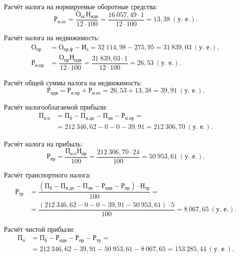 Расчёт налога на нормируемые оборотные средства:
\begin{equation*}
  \text{Р}_{\text{н.ос}} =
  \dfrac{\text{О}_{\text{ос}} \text{Н}_{\text{ндв}}}{12 \cdot 100} =
  \dfrac{16~057{,}49 \cdot 1}{12 \cdot 100} = 13{,}38 ~ (\text{у.~е.}).
\end{equation*}

Расчёт налога на недвижимость:
\begin{align*}
  \text{О}_{\text{пр}} &= \text{О}_{\text{пр.ф}} - \text{И}_{\text{з}} =
  32~114{,}98 - 275{,}95 = 31~839{,}03 ~ (\text{у.~е.}), \\
  \text{Р}_{\text{н.пр}} &=
  \dfrac{\text{О}_{\text{пр}} \text{Н}_{\text{ндв}}}{12 \cdot 100} =
  \dfrac{31~839{,}03 \cdot 1}{12 \cdot 100} =
  26{,}53~(\text{у.~е.}).
\end{align*}

Расчёт общей суммы налога на недвижимость:
\begin{equation*}
  \text{Р}_{\text{ндв}} = \text{Р}_{\text{н.пр}} + \text{Р}_{\text{н.ос}} =
  26{,}53 + 13{,}38 = 39{,}91~(\text{у.~е.}).
\end{equation*}

Расчёт налогооблагаемой прибыли:
\begin{align*}
  \text{П}_{\text{н.о}} &= \text{П}_{\text{б}} -
  \text{П}_{\text{н.до}} - \text{П}_{\text{лн}} - \text{Р}_{\text{н.пр}} = \\
  &= 212~346{,}62 - 0 - 0 - 39{,}91 = 212~306{,}70~(\text{у.~е.}).
\end{align*}

Расчёт налога на прибыль:
\begin{equation*}
  \text{Р}_{\text{пр}} =
  \dfrac{\text{П}_{\text{н.о}} \text{Н}_{\text{пр}}}{100} =
  \dfrac{212~306{,}70 \cdot 24}{100} =
  50~953{,}61~(\text{у.~е.}).
\end{equation*}

Расчёт транспортного налога:
\begin{align*}
  \text{Р}_{\text{тр}} &=
  \dfrac{
    (\text{П}_{\text{б}} - \text{П}_{\text{н.до}} - \text{П}_{\text{лн}} -
    \text{Р}_{\text{ндв}} - \text{Р}_{\text{пр}}) \cdot \text{Н}_{\text{тр}}
  }{100} = \\
  &= \dfrac{(212~346{,}62 - 0 - 0 - 39{,}91 - 50~953{,}61) \cdot 5}{100} =
  8~067{,}65~(\text{у.~е.}).
\end{align*}

Расчёт чистой прибыли:
\begin{align*}
  \text{П}_{\text{ч}} &= \text{П}_{\text{б}} -
  \text{Р}_{\text{ндв}} - \text{Р}_{\text{пр}}  - \text{Р}_{\text{тр}} = \\
  &= 212~346{,}62 - 39{,}91 - 50~953{,}61 - 8~067{,}65 = 153~285{,}44~(\text{у.~е.}).
\end{align*}


